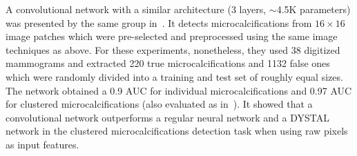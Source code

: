 

\begin{comment} Lo 1998
- similar to Lo 1995:
	detect microcalcifications
	pre-selected image patches
	8 rotations per image(0,90,180,270 and flipped)
	sigmoid activation function
	16 by 16 pixel size
	5 by 5 filters
	2 outputs
	clustering method
- only 10 groups per layer
- "Typically, the sizes of microcalcifications vary from 0.16 mm to 1.0 mm."
- each pixel 0.1mm, more than that may make dissapear the microcalc.
- DYSTAL network, regular neural network, and convolutional network. convnet ouptperforms them.
- rotation and translation invariance.
- gaussian-like activation function in input (?)
- 38 "digital" mammograms: 220 true and 1132 subtle microcalcififcations
- divided into two roughly equal sets for test (no cross validation)
- 0.9 AUC for microcalc and 0.97 AUC for clustered microcalcif
\end{comment}
A convolutional network with a similar architecture (3 layers, $\sim$4.5K parameters) was presented by the same group in~\cite{Lo1998}. It detects microcalcifications from $16 \times 16$ image patches which were pre-selected and preprocessed using the same image techniques as above. For these experiments, nonetheless, they used 38 digitized mammograms and extracted 220 true microcalcifications and 1132 false ones which were randomly divided into a training and test set of roughly equal sizes. The network obtained a 0.9 AUC for individual microcalcifications and 0.97 AUC for clustered microcalcifications (also evaluated as in~\cite{Lo1995}). It showed that a convolutional network outperforms a regular neural network and a DYSTAL network in the clustered microcalcifications detection task when using raw pixels as input features.





